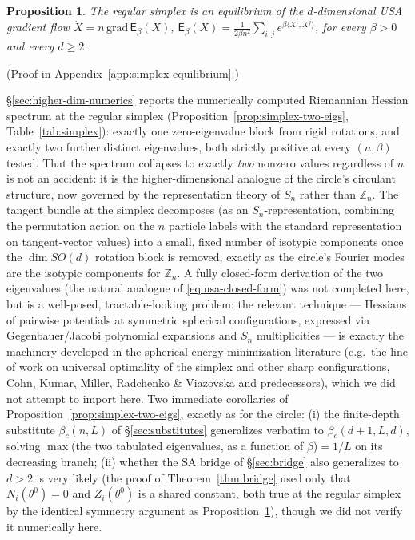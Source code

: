 \documentclass[11pt]{article}
\newtheorem{proposition}[theorem]{Proposition}
\begin{document}
\begin{proposition}
\label{prop:simplex-equilibrium}
The regular simplex is an equilibrium of the $d$-dimensional USA gradient flow $\dot X = n\,\mathrm{grad}\,\mathsf{E}_\beta(X)$, $\mathsf{E}_\beta(X)=\frac{1}{2\beta n^2}\sum_{i,j}e^{\beta\langle X^i,X^j\rangle}$, for every $\beta>0$ and every $d\ge2$.
\end{proposition}
(Proof in Appendix~\ref{app:simplex-equilibrium}.)

\S\ref{sec:higher-dim-numerics} reports the numerically computed Riemannian Hessian spectrum at the regular simplex (Proposition~\ref{prop:simplex-two-eigs}, Table~\ref{tab:simplex}): exactly one zero-eigenvalue block from rigid rotations, and exactly two further distinct eigenvalues, both strictly positive at every $(n,\beta)$ tested. That the spectrum collapses to exactly \emph{two} nonzero values regardless of $n$ is not an accident: it is the higher-dimensional analogue of the circle's circulant structure, now governed by the representation theory of $S_n$ rather than $\mathbb{Z}_n$. The tangent bundle at the simplex decomposes (as an $S_n$-representation, combining the permutation action on the $n$ particle labels with the standard representation on tangent-vector values) into a small, fixed number of isotypic components once the $\dim SO(d)$ rotation block is removed, exactly as the circle's Fourier modes are the isotypic components for $\mathbb{Z}_n$. A fully closed-form derivation of the two eigenvalues (the natural analogue of \eqref{eq:usa-closed-form}) was not completed here, but is a well-posed, tractable-looking problem: the relevant technique --- Hessians of pairwise potentials at symmetric spherical configurations, expressed via Gegenbauer/Jacobi polynomial expansions and $S_n$ multiplicities --- is exactly the machinery developed in the spherical energy-minimization literature (e.g.\ the line of work on universal optimality of the simplex and other sharp configurations, Cohn, Kumar, Miller, Radchenko \& Viazovska and predecessors), which we did not attempt to import here. Two immediate corollaries of Proposition~\ref{prop:simplex-two-eigs}, exactly as for the circle: (i) the finite-depth substitute $\beta_c(n,L)$ of \S\ref{sec:substitutes} generalizes verbatim to $\beta_c(d{+}1,L,d)$, solving $\max$(the two tabulated eigenvalues, as a function of $\beta$)$=1/L$ on its decreasing branch; (ii) whether the SA bridge of \S\ref{sec:bridge} also generalizes to $d>2$ is very likely (the proof of Theorem~\ref{thm:bridge} used only that $N_i(\theta^0)=0$ and $Z_i(\theta^0)$ is a shared constant, both true at the regular simplex by the identical symmetry argument as Proposition~\ref{prop:simplex-equilibrium}), though we did not verify it numerically here.
\end{document}
